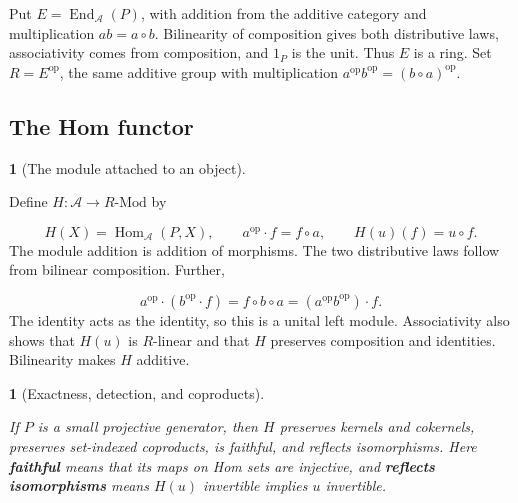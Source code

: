 \documentclass[11pt,a4paper]{article}
\newcommand{\mathheading}{}
\theoremstyle{plain}
\newtheorem*{plainstatement}{\mathheading}
\theoremstyle{definition}
\newtheorem*{definitionstatement}{\mathheading}
\newenvironment{mathstatement}[3]{\renewcommand{\mathheading}{#1 #2}\begin{plainstatement}[#3]}{\end{plainstatement}}
\newenvironment{mathdefinition}[3]{\renewcommand{\mathheading}{#1 #2}\begin{definitionstatement}[#3]}{\end{definitionstatement}}
\begin{document}
Put \(E=\operatorname{End}_{\mathcal A}(P)\), with addition from the additive category and multiplication \(ab=a\circ b\). Bilinearity of composition gives both distributive laws, associativity comes from composition, and \(1_P\) is the unit. Thus \(E\) is a ring. Set \(R=E^{\mathrm{op}}\), the same additive group with multiplication \(a^{\mathrm{op}}b^{\mathrm{op}}=(b\circ a)^{\mathrm{op}}\).

 
\par{}\par
 
\subsection{The Hom functor}
\label{hom}
 
\begin{mathdefinition}{Definition}{8.2}{The module attached to an object}
\label{env-8-2}

Define \(H:\mathcal A\to R\text{-Mod}\) by

 \[H(X)=\operatorname{Hom}_{\mathcal A}(P,X),\qquad a^{\mathrm{op}}\cdot f=f\circ a,\qquad H(u)(f)=u\circ f.\] 
The module addition is addition of morphisms. The two distributive laws follow from bilinear composition. Further,

 \[a^{\mathrm{op}}\cdot(b^{\mathrm{op}}\cdot f)=f\circ b\circ a=(a^{\mathrm{op}}b^{\mathrm{op}})\cdot f.\] 
The identity acts as the identity, so this is a unital left module. Associativity also shows that \(H(u)\) is \(R\)-linear and that \(H\) preserves composition and identities. Bilinearity makes \(H\) additive.


\par{}\par

\end{mathdefinition}
 
\begin{mathstatement}{Lemma}{8.3}{Exactness, detection, and coproducts}
\label{env-8-3}

If \(P\) is a small projective generator, then \(H\) preserves kernels and cokernels, preserves set-indexed coproducts, is faithful, and reflects isomorphisms. Here \textbf{faithful} means that its maps on Hom sets are injective, and \textbf{reflects isomorphisms} means \(H(u)\) invertible implies \(u\) invertible.


\par{}\par

\end{mathstatement}
 
\end{document}
